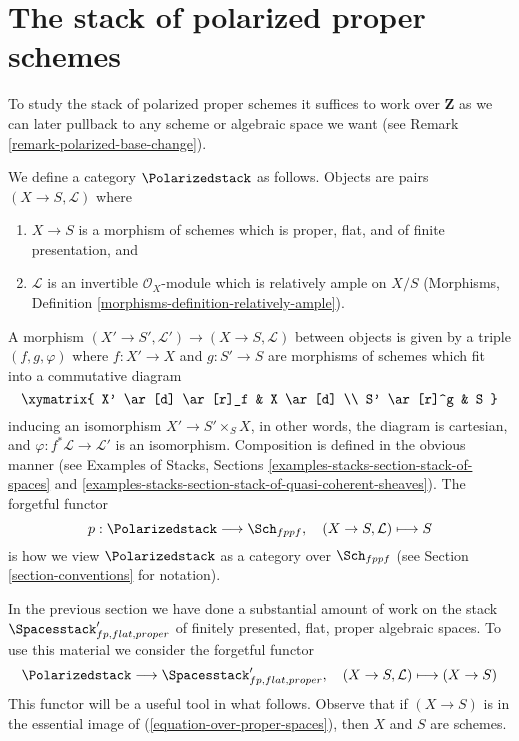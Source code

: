 \section{The stack of polarized proper schemes}
\label{section-polarized}

\noindent
To study the stack of polarized proper schemes it suffices to work
over $\mathbf{Z}$ as we can later pullback to any scheme or algebraic
space we want (see Remark \ref{remark-polarized-base-change}).

\begin{situation}
\label{situation-polarized}
We define a category $\Polarizedstack$ as follows. Objects are
pairs $(X \to S, \mathcal{L})$ where
\begin{enumerate}
\item $X \to S$ is a morphism of schemes which is proper, flat, and
of finite presentation, and
\item $\mathcal{L}$ is an invertible $\mathcal{O}_X$-module
which is relatively ample on $X/S$
(Morphisms, Definition \ref{morphisms-definition-relatively-ample}).
\end{enumerate}
A morphism $(X' \to S', \mathcal{L}') \to (X \to S, \mathcal{L})$
between objects
is given by a triple $(f, g, \varphi)$ where $f : X' \to X$ and $g : S' \to S$
are morphisms of schemes which fit into a commutative diagram
$$
\xymatrix{
X' \ar[d] \ar[r]_f & X \ar[d] \\
S' \ar[r]^g & S
}
$$
inducing an isomorphism $X' \to S' \times_S X$, in other words, the
diagram is cartesian,
and $\varphi : f^*\mathcal{L} \to \mathcal{L}'$ is an isomorphism.
Composition is defined in the obvious manner (see
Examples of Stacks, Sections
\ref{examples-stacks-section-stack-of-spaces} and
\ref{examples-stacks-section-stack-of-quasi-coherent-sheaves}).
The forgetful functor
$$
p : \Polarizedstack \longrightarrow \Sch_{fppf},\quad
(X \to S, \mathcal{L}) \longmapsto S
$$
is how we view $\Polarizedstack$ as a category over $\Sch_{fppf}$
(see Section \ref{section-conventions} for notation).
\end{situation}

\noindent
In the previous section we have done a substantial amount of work on the stack
$\Spacesstack'_{fp, flat, proper}$
of finitely presented, flat, proper algebraic spaces. To use this material
we consider the forgetful functor
\begin{equation}
\label{equation-over-proper-spaces}
\Polarizedstack \longrightarrow
\Spacesstack'_{fp, flat, proper},\quad
(X \to S, \mathcal{L}) \longmapsto (X \to S)
\end{equation}
This functor will be a useful tool in what follows.
Observe that if $(X \to S)$ is in the essential image
of (\ref{equation-over-proper-spaces}), then
$X$ and $S$ are schemes.

